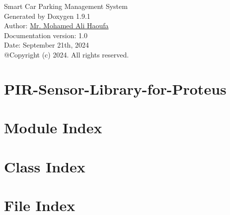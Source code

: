 \let\mypdfximage\pdfximage\def\pdfximage{\immediate\mypdfximage}\documentclass[twoside]{book}
\newcommand{\+}{\discretionary{\mbox{\scriptsize$\hookleftarrow$}}{}{}}
\newcommand{\clearemptydoublepage}{%
  \newpage{\pagestyle{empty}\cleardoublepage}%
}
\begin{document}
\raggedbottom

\hypersetup{pageanchor=false,
             bookmarksnumbered=true,
             pdfencoding=unicode
            }
\begin{titlepage}
\vspace*{7cm}
\begin{center}%
{\Large Smart Car Parking Management System}\\
\vspace*{1cm}
{\large Generated by Doxygen 1.9.1}\\
\vspace*{11cm}
{\large Author: \href{https://www.linkedin.com/in/mohamed-ali-haoufa/}{ Mr. Mohamed Ali Haoufa}}\\
\vspace*{0.3cm}
{\large Documentation version: 1.0}\\
\vspace*{0.3cm}
{\large Date: September 21th, 2024}\\
\vspace*{1cm}
{\large @Copyright (c) 2024. All rights reserved.}\\
\end{center}
\end{titlepage}
\clearemptydoublepage
{}
\tableofcontents
\clearemptydoublepage
{}
\hypersetup{pageanchor=true}

\chapter{PIR-\/\+Sensor-\/\+Library-\/for-\/\+Proteus}
\label{md_docs_simulation_PIR_Sensor_Library_for_Proteus_master_README}

\chapter{Module Index}

\chapter{Class Index}

\chapter{File Index}

\end{document}
